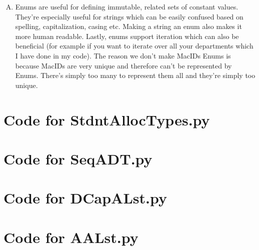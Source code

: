 \documentclass[12pt]{article}
\begin{document}
\begin{enumerate}[A)]
\item Enums are useful for defining immutable, related sets of constant values. They're especially useful for strings which can be easily confused based on spelling, capitalization, casing etc.
      Making a string an enum also makes it more human readable. Lastly, enums support iteration which can also be beneficial (for example if you want to iterate over all your departments which I have done in my code).
      The reason we don't make MacIDs Enums is because MacIDs are very unique and therefore can't be represented by Enums. There's simply too many to represent them all and they're simply too unique.

\end{enumerate}

\newpage

\lstset{language=Python, basicstyle=\tiny, breaklines=true, showspaces=false,
  showstringspaces=false, breakatwhitespace=true}

\def\thesection{\Alph{section}}

\section{Code for StdntAllocTypes.py}

\noindent 

\newpage

\section{Code for SeqADT.py}

\noindent 

\newpage

\section{Code for DCapALst.py}

\noindent 

\newpage

\section{Code for AALst.py}

\noindent 

\newpage
\end{document}
